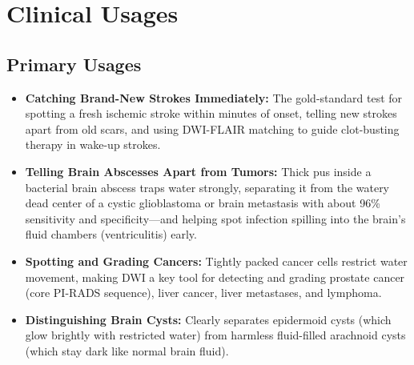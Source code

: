\section{Clinical Usages}

\subsection{Primary Usages}
\begin{itemize}
\item \textbf{Catching Brand-New Strokes Immediately:} The gold-standard test for spotting a fresh ischemic stroke within minutes of onset, telling new strokes apart from old scars, and using DWI-FLAIR matching to guide clot-busting therapy in wake-up strokes.
\item \textbf{Telling Brain Abscesses Apart from Tumors:} Thick pus inside a bacterial brain abscess traps water strongly, separating it from the watery dead center of a cystic glioblastoma or brain metastasis with about 96\% sensitivity and specificity---and helping spot infection spilling into the brain's fluid chambers (ventriculitis) early.
\item \textbf{Spotting and Grading Cancers:} Tightly packed cancer cells restrict water movement, making DWI a key tool for detecting and grading prostate cancer (core PI-RADS sequence), liver cancer, liver metastases, and lymphoma.
\item \textbf{Distinguishing Brain Cysts:} Clearly separates epidermoid cysts (which glow brightly with restricted water) from harmless fluid-filled arachnoid cysts (which stay dark like normal brain fluid).
\end{itemize}

